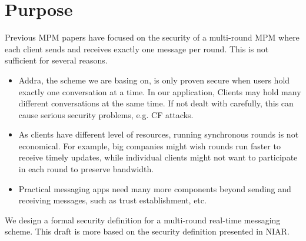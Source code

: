 \section{Purpose}
Previous MPM papers have focused on the security of a multi-round MPM where each client sends and receives exactly one message per round. This is not sufficient for several reasons.
\begin{itemize}
    \item Addra, the scheme we are basing on, is only proven secure when users hold exactly one conversation at a time. In our application, Clients may hold many different conversations at the same time. If not dealt with carefully, this can cause serious security problems, e.g. CF attacks. 
    \item As clients have different level of resources, running synchronous rounds is not economical. For example, big companies might wish rounds run faster to receive timely updates, while individual clients might not want to participate in each round to preserve bandwidth. 
    \item Practical messaging apps need many more components beyond sending and receiving messages, such as trust establishment, etc. 
\end{itemize}


We design a formal security definition for a multi-round real-time messaging scheme. This draft is more based on the security definition presented in NIAR. 



